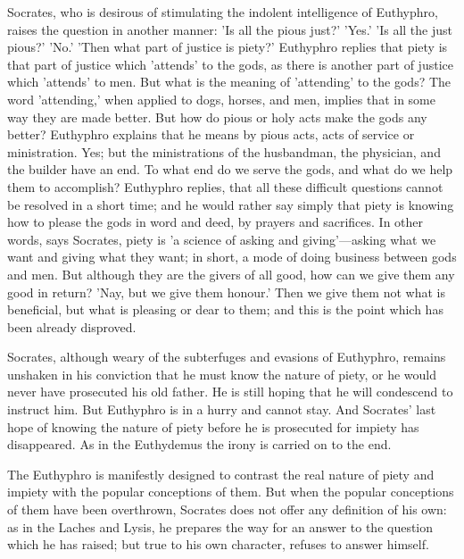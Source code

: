 \documentclass[11pt,letter]{article}
\begin{document}
\par  Socrates, who is desirous of stimulating the indolent intelligence of Euthyphro, raises the question in another manner: 'Is all the pious just?' 'Yes.' 'Is all the just pious?' 'No.' 'Then what part of justice is piety?' Euthyphro replies that piety is that part of justice which 'attends' to the gods, as there is another part of justice which 'attends' to men. But what is the meaning of 'attending' to the gods? The word 'attending,' when applied to dogs, horses, and men, implies that in some way they are made better. But how do pious or holy acts make the gods any better? Euthyphro explains that he means by pious acts, acts of service or ministration. Yes; but the ministrations of the husbandman, the physician, and the builder have an end. To what end do we serve the gods, and what do we help them to accomplish? Euthyphro replies, that all these difficult questions cannot be resolved in a short time; and he would rather say simply that piety is knowing how to please the gods in word and deed, by prayers and sacrifices. In other words, says Socrates, piety is 'a science of asking and giving'—asking what we want and giving what they want; in short, a mode of doing business between gods and men. But although they are the givers of all good, how can we give them any good in return? 'Nay, but we give them honour.' Then we give them not what is beneficial, but what is pleasing or dear to them; and this is the point which has been already disproved.

\par  Socrates, although weary of the subterfuges and evasions of Euthyphro, remains unshaken in his conviction that he must know the nature of piety, or he would never have prosecuted his old father. He is still hoping that he will condescend to instruct him. But Euthyphro is in a hurry and cannot stay. And Socrates' last hope of knowing the nature of piety before he is prosecuted for impiety has disappeared. As in the Euthydemus the irony is carried on to the end.

\par  The Euthyphro is manifestly designed to contrast the real nature of piety and impiety with the popular conceptions of them. But when the popular conceptions of them have been overthrown, Socrates does not offer any definition of his own: as in the Laches and Lysis, he prepares the way for an answer to the question which he has raised; but true to his own character, refuses to answer himself.
\end{document}
